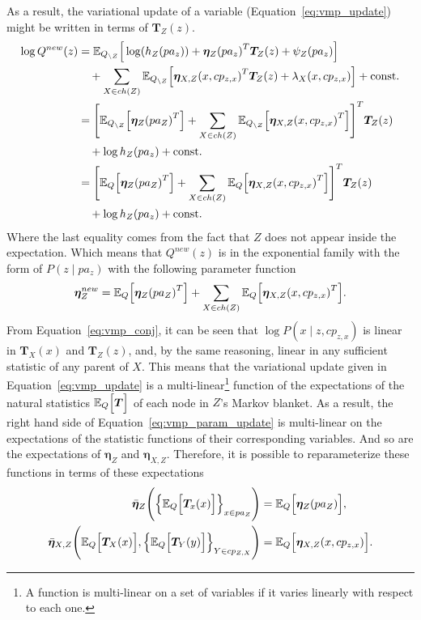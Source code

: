 As a result, the variational update of a variable (Equation~\ref{eq:vmp_update}) might be written in terms of \(\bm{T}_{Z}(z)\).
\[
    \begin{aligned}
     \log Q^{new}(z) &= \mathbb{E}_{Q_{\backslash Z}}\Big[\log(h_Z (pa_z)) + \bm{\eta}_Z{(pa_z)}^T \bm{T}_Z(z) + \psi_Z(pa_z)\Big]\\
     &\quad+ \sum_{X \in ch(Z)} \mathbb{E}_{Q_{\backslash Z}}\Big[ \bm{\eta}_{X, Z}{(x, cp_{z,x})}^T \bm{T}_Z(z) + \lambda_{X}(x, cp_{z,x}) \Big] + \text{const.}\\
     &= {\Bigg[ \mathbb{E}_{Q_{\backslash Z}}\Big[\bm{\eta}_Z{(pa_Z)}^T\Big] + \sum_{X \in ch(Z)} \mathbb{E}_{Q_{\backslash Z}}\Big[ \bm{\eta}_{X, Z}{(x, cp_{z,x})}^T\Big]  \Bigg]}^T \bm{T}_Z(z) \\
     &\quad+ \log h_{Z}(pa_z)+ \text{const.}\\
     &= {\Bigg[ \mathbb{E}_{Q}\Big[\bm{\eta}_Z{(pa_Z)}^T\Big] + \sum_{X \in ch(Z)} \mathbb{E}_{Q}\Big[ \bm{\eta}_{X, Z}{(x, cp_{z,x})}^T\Big]  \Bigg]}^T \bm{T}_Z(z) \\
     &\quad+ \log h_{Z}(pa_z)+ \text{const.}
   \end{aligned}
 \]
 Where the last equality comes from the fact that \(Z\) does not appear inside the expectation. Which means that \( Q^{new}(z) \) is in the exponential family with the form of \( P(z \mid pa_z) \) with the following parameter function
 \begin{equation}\label{eq:vmp_param_update}
   \bm{\eta}^{new}_Z =  \mathbb{E}_{Q}\Big[\bm{\eta}_Z{(pa_Z)}^T\Big] + \sum_{X \in ch(Z)} \mathbb{E}_{Q}\Big[ \bm{\eta}_{X, Z}{(x, cp_{z,x})}^T\Big].
 \end{equation}
 From Equation~\ref{eq:vmp_conj}, it can be seen that \( \log P(x \mid z , cp_{z,x}) \) is linear in \( \bm{T}_X(x) \) and \( \bm{T}_Z(z) \), and, by the same reasoning, linear in any sufficient statistic of any parent of \( X \). This means that the variational update given in Equation~\ref{eq:vmp_update} is a multi-linear\footnote{A function is multi-linear on a set of variables if it varies linearly with respect to each one.} function of the expectations of the natural statistics \(\mathbb{E}_{Q}\Big[\bm{T}\Big]\) of each node in \(Z\)'s Markov blanket. As a result, the right hand side of Equation~\ref{eq:vmp_param_update} is multi-linear on the expectations of the statistic functions of their corresponding variables. And so are the expectations of \( \bm{\eta}_Z \) and \( \bm{\eta}_{X, Z} \). Therefore, it is possible to reparameterize these functions in terms of these expectations
\[
  \begin{aligned}
    \bar{\bm{\eta}}_Z \Bigg(\Big\{ \mathbb{E}_{Q}\Big[\bm{T}_{x}(x)\Big] \Big\}_{x \in pa_Z} \Bigg) &= \mathbb{E}_{Q}\Big[\bm{\eta}_Z(pa_Z)\Big],\\
    \bar{\bm{\eta}}_{X,Z} \Bigg(  \mathbb{E}_{Q}\Big[\bm{T}_{X}(x)\Big], \Big\{ \mathbb{E}_{Q}\Big[\bm{T}_{Y}(y)\Big] \Big\}_{Y \in cp_{Z,X}}\Bigg) &= \mathbb{E}_{Q}\Big[\bm{\eta}_{X, Z}(x, cp_{z,x})\Big].\\
  \end{aligned}
\]


